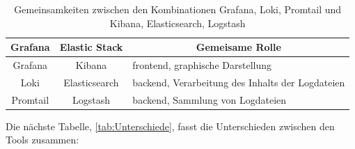 \begin{table}[H]
   \begin{tabularx}{\textwidth}{|c|c|X|}
   \hline
   \multicolumn{1}{|c|}{\textbf{Grafana}} & \multicolumn{1}{|c|}{\textbf{Elastic Stack}} & \multicolumn{1}{|c|}{\textbf{Gemeisame Rolle}} \\
   \hline
      Grafana & Kibana & \gls{frontend}, graphische Darstellung\\
   \hline
      Loki & Elasticsearch & \gls{backend}, Verarbeitung des Inhalts der Logdateien \\
   \hline
      Promtail & Logstash & \gls{backend}, Sammlung von Logdateien \\
      \hline
   \end{tabularx}
   \caption[Gemeinsamkeiten zwischen den Kombinationen Grafana, Loki, Promtail und Kibana, Elasticsearch, Logstash]
   {Gemeinsamkeiten zwischen den Kombinationen Grafana, Loki, Promtail und Kibana, Elasticsearch, Logstash}
   \label{tab:Vergleich_GrafanaELK}
\end{table}

Die nächste Tabelle, \ref{tab:Unterschiede}, fasst die Unterschieden zwischen den Tools zusammen:

